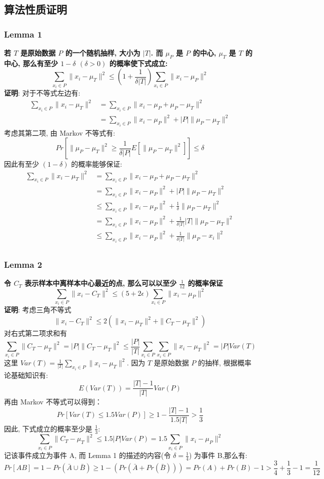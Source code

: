 \documentclass[UTF8]{article}
\begin{document}
\subsection*{算法性质证明}
\subsubsection*{Lemma 1}
\noindent \textbf{若 $T$ 是原始数据 $P$ 的一个随机抽样, 大小为 $|T|$. 而 $\mu_P$ 是 $P$ 的中心, $\mu_T$ 是 $T$ 的中心, 那么有至少 $1-\delta$ $(\delta > 0)$ 的概率使下式成立:
$$\sum\limits_{x_i \in P}\|x_i-\mu_T\|^2 \le (1+\frac{1}{\delta|T|})\sum\limits_{x_i\in P}\|x_i-\mu_P\|^2$$}
\noindent
\textbf{证明}: 对于不等式左边有:
\begin{align*}
	\sum\limits_{x_i \in P}\|x_i-\mu_T\|^2
	&=\sum\limits_{x_i \in P} \|x_i-\mu_P + \mu_P -\mu_T\|^2 \\
	&=\sum\limits_{x_i \in P} \|x_i-\mu_P\|^2 + |P|\|\mu_P -\mu_T\|^2
\end{align*}
考虑其第二项, 由 Markov 不等式有:
$$Pr\left[\|\mu_P -\mu_T\|^2 \ge \frac{1}{\delta |P|}E[\|\mu_P -\mu_T\|^2]\right] \le \delta$$
因此有至少 $(1-\delta)$ 的概率能够保证:
\begin{align*}
	\sum\limits_{x_i \in P}\|x_i-\mu_T\|^2
	&=\sum\limits_{x_i \in P} \|x_i-\mu_P + \mu_P -\mu_T\|^2 \\
	&=\sum\limits_{x_i \in P} \|x_i-\mu_P\|^2 + |P|\|\mu_P -\mu_T\|^2 \\
	&\le \sum\limits_{x_i \in P} \|x_i-\mu_P\|^2 + \frac{1}{\delta}\|\mu_P -\mu_T\|^2 \\
	&= \sum\limits_{x_i \in P} \|x_i-\mu_P\|^2 + \frac{1}{\delta |T|}|T|\|\mu_P -\mu_T\|^2 \\
	&\le \sum\limits_{x_i \in P} \|x_i-\mu_P\|^2 + \frac{1}{\delta |T|}\|\mu_P -x_i\|^2 \\
\end{align*}

\subsubsection*{Lemma 2}
\noindent \textbf{令 $C_T$ 表示样本中离样本中心最近的点, 那么可以以至少 $\frac{1}{12}$ 的概率保证
$$\sum\limits_{x_i\in P}\|x_i-C_T\|^2 \le (5+2\epsilon)\sum\limits_{x_i\in P}\|x_i-\mu_P\|^2$$}
\noindent
\textbf{证明}: 考虑三角不等式
$$\|x_i-C_T\|^2 \le 2(\|x_i-\mu_T\|^2 + \|C_T-\mu_T\|^2)$$
对右式第二项求和有
$$\sum\limits_{x_i \in P}\|C_T-\mu_T\|^2 = |P|\|C_T-\mu_T\|^2 \le \frac{|P|}{|T|}\sum\limits_{x_i \in P}\sum\limits_{x_i \in P}\|x_i - \mu_T\|^2 = |P|Var(T)$$
这里 $Var(T)=\frac{1}{|T|}\sum_{x_i \in P}\|x_i-\mu_T\|^2$. 因为 $T$ 是原始数据 $P$ 的抽样, 根据概率论基础知识有:
$$E(Var(T))=\frac{|T|-1}{|T|}Var(P)$$
再由 Markov 不等式可以得到：
$$Pr[Var(T) \le 1.5Var(P)] \ge 1-\frac{|T|-1}{1.5|T|} > \frac{1}{3}$$
因此, 下式成立的概率至少是 $\frac{1}{3}$:
$$\sum\limits_{x_i\in P}\|C_T-\mu_T\|^2 \le 1.5|P|Var(P) = 1.5\sum\limits_{x_i \in P}\|x_i - \mu_P\|^2$$
记该事件成立为事件 A, 而 Lemma 1 的描述的内容(令 $\delta=\frac{1}{4}$) 为事件 B,那么有:
$$Pr[AB]=1-Pr(\bar{A}\cup\bar{B})\ge1-(Pr(\bar{A}+Pr(\bar{B})))=Pr(A)+Pr(B)-1 > \frac{3}{4} + \frac{1}{3} - 1 = \frac{1}{12}$$
\end{document}
